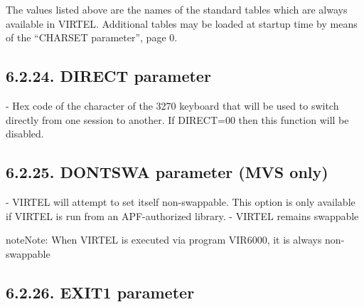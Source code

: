 \documentclass[letterpaper,10pt,english]{sphinxmanual}
\begin{document}
The values listed above are the names of the standard tables which are always available in VIRTEL. Additional tables
may be loaded at startup time by means of the “CHARSET parameter”, page 0.


\subsection{6.2.24. DIRECT parameter}
\label{\detokenize{Installation_Guide:direct-parameter}}
\begin{sphinxVerbatim}[commandchars=\\\{\}]
  
\end{sphinxVerbatim}

 - Hex code of the character of the 3270 keyboard that will be used to switch directly from one session to another. If DIRECT=00 then this function will be disabled.


\subsection{6.2.25. DONTSWA parameter (MVS only)}
\label{\detokenize{Installation_Guide:dontswa-parameter-mvs-only}}
\begin{sphinxVerbatim}[commandchars=\\\{\}]
 
\end{sphinxVerbatim}

 - VIRTEL will attempt to set itself non-swappable. This option is only available if VIRTEL is run from an APF-authorized library.
 - VIRTEL remains swappable

\begin{sphinxadmonition}{note}{Note:}
When VIRTEL is executed via program VIR6000, it is always non-swappable
\end{sphinxadmonition}


\subsection{6.2.26. EXIT1 parameter}
\label{\detokenize{Installation_Guide:exit1-parameter}}
\begin{sphinxVerbatim}[commandchars=\\\{\}]
 
\end{sphinxVerbatim}
\end{document}
